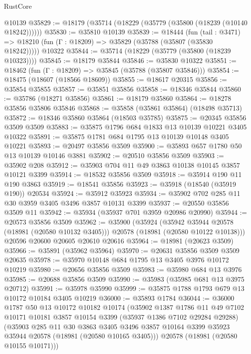 \begin{lexlean}{RustCore}
\begin{coremodule}
    @10139
@35829 := @18179 (@35714 (@18229 (@35779 (@35800 (@18239 (@10140 @18242))))))
@35830 := @35810 @10139
@35839 := @18444
    (fun (tail : @3471) => @18210 (fun (Γ : @18209) => @35829 (@35788 (@35807 (@35830 @18242)))))
    @10322
@35844 := @35714 (@18229 (@35779 (@35800 (@18239 @10323))))
@35845 := @18179 @35844
@35846 := @35830 @10322
@35851 := @18462 (fun (Γ : @18209) => @35845 (@35788 (@35807 @35846)))
@35854 := @18475 (@18607 (@18566 @18609))
@35855 := @18617 @20315
@35856 := @35854 @35855
@35857 := @35851 @35856
@35858 := @18346 @35844
@35860 := @35786 (@18271 @35856)
@35861 := @18179 @35860
@35864 := @18278 @35856 @35806 @35846
@35868 := @35858 (@35861 @35864) (@18498 @35713)
@35872 := @18346 @35860 @35864 (@18503 @35785)
@35875 := @20345 @35856 @3509 @3509
@35883 := @35875 @1796 @684 @1833 @13 @10139 @10221 @3405 @10322
@35891 := @35875 @1781 @684 @1795 @13 @10139 @10148 @3405 @10221
@35893 := @20497 @35856 @3509
@35900 := @35893 @657 @1780 @50 @13 @10139 @10146 @3881
@35902 := @20510 @35856 @3509
@35903 := @35902 @208
@35912 := @35903 @704 @11 @49 @3863 @10138 @10145 @3857 @10121 @3399
@35914 := @18532 @35856 @3509
@35918 := @35914 @190 @11 @190 @3863
@35919 := @18541 @35856
@35923 := @35918 (@18540 (@35919 @190)) @20534
@35924 := @35912 @35923
@35934 := @35902 @702 @285 @11 @30 @3959 @3405 @3496 @3857 @10131 @3399
@35937 := @20550 @35856 @3509 @11
@35942 := @35934 (@35937 @701 @3959 @20986 @20990)
@35944 := @20573 @35856 @3509
@35962 := @35900
    (@35924
      (@35942 @35944 @20578 (@18981 (@20580 @10132 @3405)))
      @20578
      (@18981 (@20580 @10122 @10138)))
    @20596
    @20600
    @20605
    @20610
    @20616
@35964 := @18981 (@20623 @3509)
@35966 := @35891 (@35962 @35964)
@35970 := @20631 @35856 @3509 @3509 @20635
@35978 := @35970 @10148 @684 @1795 @13 @3405 @3976 @10172 @10219
@35980 := @20656 @35856 @3509
@35983 := @35980 @684 @13 @3976
@35985 := @20688 @35856 @3509
@35990 := @35983 (@35985 @681 @13 @3975 @20712)
@35991 := @35978 @35990
@35999 := @35875 @1788 @1793 @679 @13 @10172 @10184 @3405 @10219
@36000 := @35893 @1784
@36044 := @36000
    @1787
    @50
    @13
    @10172
    @10182
    @10174
    (@35902
      @1387
      @1786
      @11
      @49
      @7102
      @10171
      @10181
      @3857
      @10154
      @3399
      (@35937 @1386 @7102 @29284 @29288)
      (@35903
        @285
        @11
        @30
        @3863
        @3405
        @3496
        @3857
        @10164
        @3399
        @35923
        @35944
        @20578
        (@18981 (@20580 @10165 @3405)))
      @20578
      (@18981 (@20580 @10155 @10171)))

\end{coremodule}
\end{lexlean}
